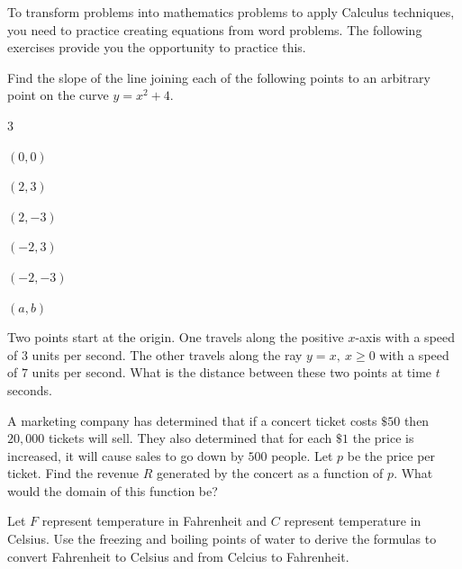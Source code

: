 \begin{ProblemSection}
  To transform problems into mathematics problems to apply Calculus
  techniques, you need to practice creating equations from word
  problems.  The following exercises provide you the opportunity to
  practice this.

  \begin{embeddedproblem}{}
    Find the slope of the line joining each of the following points to
    an arbitrary point on the curve $ y=x^2+4.$
    \begin{enumerate}[label={\bf{}(\alph*)}]
      \begin{multicols}{3}
      \item $(0,0)$
      \item $(2,3)$
      \item $(2,-3)$
      \item $(-2,3)$
      \item $(-2,-3)$
      \item $(a,b)$
      \end{multicols}
    \end{enumerate}
  \end{embeddedproblem}


  \begin{embeddedproblem}{}
    Two points start at the origin.  One travels along the positive
    $x$-axis with a speed of $3$ units per second.  The other travels
    along the ray $y=x,\ x\ge0$ with a speed of $7$ units per second.  What is
    the distance between these two points at time $t$ seconds.
  \end{embeddedproblem}

  \begin{embeddedproblem}{}
    A marketing company has determined that if a concert ticket costs
    $\$50$ then $20,000$ tickets will sell.  They also determined that
    for each $\$1$ the price is increased, it will cause sales to go
    down by $500$ people.  Let $p$ be the price per ticket.  Find the
    revenue $R$ generated by the concert as a function of $p.$  What
    would the domain of this function be? 
  \end{embeddedproblem}
   
  \begin{embeddedproblem}{}
    Let $F$ represent temperature in Fahrenheit and $C$ represent
    temperature in Celsius. Use the freezing and boiling points of
    water to derive the formulas to convert Fahrenheit to Celsius and
    from Celcius to Fahrenheit.


\end{embeddedproblem}
\end{ProblemSection}
